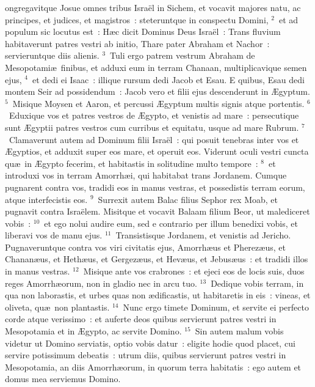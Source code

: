 \bchapter
{}ongregavitque Josue omnes tribus Isra\"el in Sichem, et vocavit majores natu, ac principes, et judices, et magistros~: steteruntque in conspectu Domini,
${}^{2}$~et ad populum sic locutus est~: H\ae c dicit Dominus Deus Isra\"el~: Trans fluvium habitaverunt patres vestri ab initio, Thare pater Abraham et Nachor~: servieruntque diis alienis.
${}^{3}$~Tuli ergo patrem vestrum Abraham de Mesopotami\ae\ finibus, et adduxi eum in terram Chanaan, multiplicavique semen ejus,
${}^{4}$~et dedi ei Isaac~: illique rursum dedi Jacob et Esau. E quibus, Esau dedi montem Seir ad possidendum~: Jacob vero et filii ejus descenderunt in \AE gyptum.
${}^{5}$~Misique Moysen et Aaron, et percussi \AE gyptum multis signis atque portentis.
${}^{6}$~Eduxique vos et patres vestros de \AE gypto, et venistis ad mare~: persecutique sunt \AE gyptii patres vestros cum curribus et equitatu, usque ad mare Rubrum.
${}^{7}$~Clamaverunt autem ad Dominum filii Isra\"el~: qui posuit tenebras inter vos et \AE gyptios, et adduxit super eos mare, et operuit eos. Viderunt oculi vestri cuncta qu\ae\ in \AE gypto fecerim, et habitastis in solitudine multo tempore~:
${}^{8}$~et introduxi vos in terram Amorrh\ae i, qui habitabat trans Jordanem. Cumque pugnarent contra vos, tradidi eos in manus vestras, et possedistis terram eorum, atque interfecistis eos.
${}^{9}$~Surrexit autem Balac filius Sephor rex Moab, et pugnavit contra Isra\"elem. Misitque et vocavit Balaam filium Beor, ut malediceret vobis~:
${}^{10}$~et ego nolui audire eum, sed e contrario per illum benedixi vobis, et liberavi vos de manu ejus.
${}^{11}$~Transistisque Jordanem, et venistis ad Jericho. Pugnaveruntque contra vos viri civitatis ejus, Amorrh\ae us et Pherez\ae us, et Chanan\ae us, et Heth\ae us, et Gergez\ae us, et Hev\ae us, et Jebus\ae us~: et tradidi illos in manus vestras.
${}^{12}$~Misique ante vos crabrones~: et ejeci eos de locis suis, duos reges Amorrh\ae orum, non in gladio nec in arcu tuo.
${}^{13}$~Dedique vobis terram, in qua non laborastis, et urbes quas non \ae dificastis, ut habitaretis in eis~: vineas, et oliveta, qu\ae\ non plantastis.
${}^{14}$~Nunc ergo timete Dominum, et servite ei perfecto corde atque verissimo~: et auferte deos quibus servierunt patres vestri in Mesopotamia et in \AE gypto, ac servite Domino.
${}^{15}$~Sin autem malum vobis videtur ut Domino serviatis, optio vobis datur~: eligite hodie quod placet, cui servire potissimum debeatis~: utrum diis, quibus servierunt patres vestri in Mesopotamia, an diis Amorrh\ae orum, in quorum terra habitatis~: ego autem et domus mea serviemus Domino.


